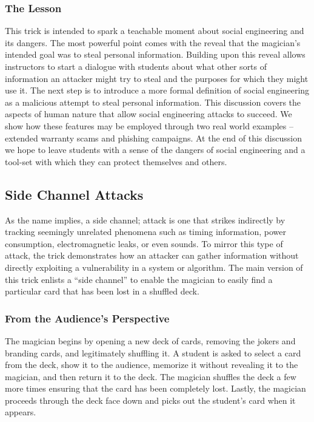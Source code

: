 \subsubsection{The Lesson}

This trick is intended to spark a teachable moment about social engineering and
its dangers.  The most powerful point comes with the reveal that the magician's
intended goal was to steal personal information.
Building upon this reveal allows instructors to start a dialogue with
students about what other
sorts of information an attacker might try to steal and the purposes for which
they might use it.
The next step is to introduce a more formal definition of social engineering as
a malicious attempt to steal personal information.
This discussion covers the aspects of human nature that allow social engineering
attacks to succeed.  We show how these features may be employed through two real world examples -- extended
warranty scams and phishing campaigns.
At the end of this discussion we hope to leave students with a sense of the
dangers of social engineering and a tool-set with which they can protect
themselves and others.

\subsection{Side Channel Attacks}

As the name implies, a side channel; attack is one that strikes indirectly
by tracking seemingly unrelated phenomena
such as timing information, power consumption, electromagnetic leaks, or even
sounds.  To mirror this type of attack, the trick
demonstrates how an attacker can
gather information without directly exploiting
a vulnerability in a system or algorithm.
The main version of this trick enlists a ``side channel'' to
enable the magician to easily
find a particular card that has been lost in a shuffled deck.

\subsubsection{From the Audience's Perspective}

The magician begins by opening a new deck of cards, removing the jokers and
branding cards, and legitimately shuffling it.  A student is asked to
select a card from the deck, show it to the audience, memorize it without
revealing it to the magician, and then return it to the deck.
The magician shuffles the deck a few more times ensuring that the card has
been completely lost.
Lastly, the magician proceeds through the deck face down and picks out the
student's card when it appears.

